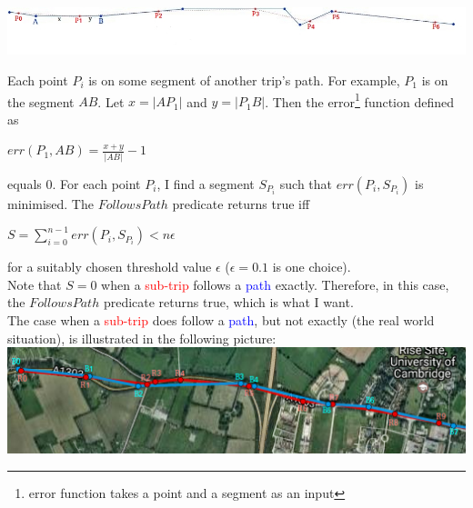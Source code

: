 \documentclass[12pt,a4paper,oneside,openright]{report}
\begin{document}
\includegraphics[width=\textwidth]{figs/follows_exactly.jpg}

Each point $P_i$ is on some segment of another trip's path.
For example, $P_1$ is on the segment $AB$.
Let $x = |AP_1|$ and $y = |P_1B|$. Then the
error\footnote{error function takes a point and a segment as an input} function
defined as \\

\begin{centering}
$err(P_1, AB) = \frac{x + y}{|AB|} - 1$ \\
\end{centering}

\:
\:
\:

equals $0$. For each point $P_i$, I find a segment $S_{P_i}$ such that
$err(P_i, S_{P_i})$ is minimised. The $FollowsPath$ predicate returns true
iff

\begin{centering}
    $S = \sum_{i=0}^{n-1} err(P_i, S_{P_i}) < n\epsilon$ \\
\end{centering}

\:
\:
\:

for a suitably chosen threshold value $\epsilon$ ($\epsilon = 0.1$ is one choice). \\

Note that $S = 0$ when a \textcolor{red}{sub-trip} follows a
\textcolor{blue}{path} exactly. Therefore, in this case, the $FollowsPath$
predicate returns true, which is what I want. \\

The case when a \textcolor{red}{sub-trip} does follow a
\textcolor{blue}{path}, but not exactly (the real world situation), 
is illustrated in the following picture: \\

\includegraphics[width=\textwidth]{figs/follows_roughly.png}
\end{document}
